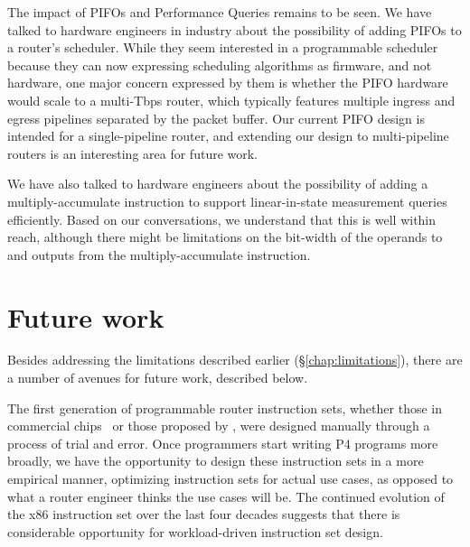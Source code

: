 The impact of PIFOs and Performance Queries remains to be seen. We have talked
to hardware engineers in industry about the possibility of adding PIFOs to a
router's scheduler. While they seem interested in a programmable scheduler
because they can now expressing scheduling algorithms as firmware, and not
hardware, one major concern expressed by them is whether the PIFO hardware
would scale to a multi-Tbps router, which typically features multiple ingress
and egress pipelines separated by the packet buffer. Our current PIFO design is
intended for a single-pipeline router, and extending our design to
multi-pipeline routers is an interesting area for future work.

We have also talked to hardware engineers about the possibility of adding a
multiply-accumulate instruction to support linear-in-state measurement queries
efficiently. Based on our conversations, we understand that this is well within
reach, although there might be limitations on the bit-width of the operands to and
outputs from the multiply-accumulate instruction.

\section{Future work}
\label{s:future}

Besides addressing the limitations described earlier (\S\ref{chap:limitations}),
there are a number of avenues for future work, described below.

 The first generation of programmable
router instruction sets, whether those in commercial chips~\cite{xpliant,
flexpipe, tofino, rmt} or those proposed by \pktlanguage, were designed
manually through a process of trial and error. Once programmers start writing
P4 programs more broadly, we have the opportunity to design these instruction sets
in a more empirical manner, optimizing instruction sets for actual use cases, as opposed to
what a router engineer thinks the use cases will be. The continued evolution
of the x86 instruction set over the last four decades suggests that there is
considerable opportunity for workload-driven instruction set design.

